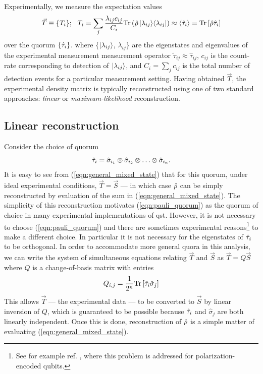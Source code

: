 Experimentally, we measure the expectation values 
\begin{equation}
    \vec{T} \equiv \{T_i\}; ~~ T_i = \sum_j 
    \frac{\lambda_{ij} c_{ij}}{C_i}
    \mathrm{Tr} \left( \hat{\rho}\, \mbox{$ | \lambda_{ij} \rangle $}\mbox{$ \langle \lambda_{ij} | $} \right)
    \approx \langle \hat{\tau}_i \rangle = \mathrm{Tr}\left[ \hat{\rho} \hat{\tau}_i \right]
\end{equation}
over the quorum $\{\hat{\tau}_i\}$. where \{$\mbox{$ | \lambda_{ij} \rangle $}$, $\lambda_{ij}$\} are the eigenstates and eigenvalues of the experimental measurement measurement operator $\tilde{\tau}_{ij} \approx \hat{\tau}_{ij}$, $c_{ij}$ is the count-rate corresponding to detection of $\mbox{$ | \lambda_{ij} \rangle $}$, and $C_i=\sum_{j} c_{ij}$ is the total number of detection events for a particular measurement setting.
Having obtained $\vec{T}$, the experimental density matrix is typically reconstructed using one of two standard approaches: \emph{linear} or \emph{maximum-likelihood} reconstruction.

\subsection{Linear reconstruction}
Consider the choice of quorum 
\begin{equation}
\hat{\tau}_i = \hat{\sigma}_{i_1} \otimes \hat{\sigma}_{i_2} \otimes \ldots \otimes \hat{\sigma}_{i_n}.
\label{eqn:pauli_quorum}
\end{equation}
It is easy to see 
from (\ref{eqn:general_mixed_state}) that for this quorum, under ideal experimental conditions, $\vec{T} = \vec{S}$ --- in which case $\hat{\rho}$ can be simply reconstructed by evaluation of the sum in (\ref{eqn:general_mixed_state}). The simplicity of this reconstruction motivates (\ref{eqn:pauli_quorum}) as the quorum of choice in many experimental implementations of \gls{qst}. However, it is not necessary to choose (\ref{eqn:pauli_quorum}) and there are sometimes experimental reasons\footnote{See for example ref. \cite{LangfordThesis}, where this problem is addressed for polarization-encoded qubits.}
to make a different choice. In particular it is not necessary for the eigenstates of $\hat{\tau}_i$ to be orthogonal. In order to accommodate more general quora in this analysis, we can write the system of simultaneous equations relating $\vec{T}$ and $\vec{S}$ as $\vec{T} = Q \vec{S}$
where $Q$ is a change-of-basis matrix with entries
\begin{equation}
    Q_{i,j}=\frac{1}{2^n} \mathrm{Tr} \left[ \hat{\tau}_i \hat{\sigma}_j \right]
\end{equation}
This allows $\vec{T}$ --- the experimental data --- to be converted to $\vec{S}$ by linear inversion of $Q$, which is guaranteed to be possible because $\hat{\tau}_i$ and $\hat{\sigma}_j$ are both linearly independent. Once this is done, reconstruction of $\hat{\rho}$ is a simple matter of evaluating (\ref{eqn:general_mixed_state}).


